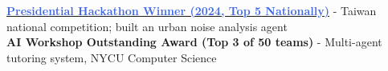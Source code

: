 %
  \href{https://english.president.gov.tw/News/6881}{\textcolor{RoyalBlue}{\textbf{Presidential Hackathon Winner (2024, Top 5 Nationally)}}} - Taiwan national competition; built an urban noise analysis agent
  \\ \textbf{AI Workshop Outstanding Award (Top 3 of 50 teams)} - Multi-agent tutoring system, NYCU Computer Science%
